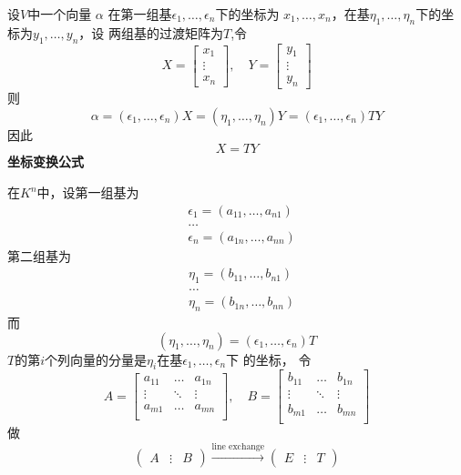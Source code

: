 \documentclass[11pt]{article}
\begin{document}
设\(V\)中一个向量 \(\alpha\) 在第一组基\(\epsilon_1,\dots,\epsilon_n\)下的坐标为
\(x_1,\dots,x_n\)，在基\(\eta_1,\dots,\eta_n\)下的坐标为\(y_1,\dots,y_n\)，设
两组基的过渡矩阵为\(T\),令
\begin{equation*}
X=
\begin{bmatrix}
x_1\\\vdots\\x_n
\end{bmatrix},\quad
Y=
\begin{bmatrix}
y_1\\\vdots\\y_n
\end{bmatrix}
\end{equation*}
则
\begin{equation*}
\alpha=(\epsilon_1,\dots,\epsilon_n)X=(\eta_1,\dots,\eta_n)Y
=(\epsilon_1,\dots,\epsilon_n)TY
\end{equation*}
因此
\begin{equation*}
X=TY
\end{equation*}
\textbf{坐标变换公式}

在\(K^n\)中，设第一组基为
\begin{align*}
&\epsilon_1=(a_{11},\dots,a_{n1})\\
&\dots\\
&\epsilon_n=(a_{1n},\dots,a_{nn})
\end{align*}
第二组基为
\begin{align*}
&\eta_1=(b_{11},\dots,b_{n1})\\
&\dots\\
&\eta_n=(b_{1n},\dots,b_{nn})
\end{align*}
而
\begin{equation*}
(\eta_1,\dots,\eta_n)=(\epsilon_1,\dots,\epsilon_n)T
\end{equation*}
\(T\)的第\(i\)个列向量的分量是\(\eta_i\)在基\(\epsilon_1,\dots,\epsilon_n\)下
的坐标，
令
\begin{equation*}
A=
\begin{bmatrix}
a_{11}&\dots&a_{1n}\\
\vdots&\ddots&\vdots\\
a_{m1}&\dots&a_{mn}\\
\end{bmatrix},\quad
B=
\begin{bmatrix}
b_{11}&\dots&b_{1n}\\
\vdots&\ddots&\vdots\\
b_{m1}&\dots&b_{mn}\\
\end{bmatrix}
\end{equation*}
做
\begin{equation*}
\begin{pmatrix}
A&\vdots&B
\end{pmatrix}\xrightarrow{\text{line exchange}}
\begin{pmatrix}
E&\vdots&T
\end{pmatrix}
\end{equation*}
\end{document}
